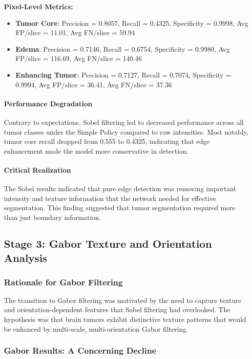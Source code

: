 \textbf{Pixel-Level Metrics:}
\begin{itemize}
    \item \textbf{Tumor Core}: Precision = 0.8057, Recall = 0.4325, Specificity = 0.9998, Avg FP/slice = 11.01, Avg FN/slice = 59.94
    \item \textbf{Edema}: Precision = 0.7146, Recall = 0.6754, Specificity = 0.9980, Avg FP/slice = 116.69, Avg FN/slice = 140.46
    \item \textbf{Enhancing Tumor}: Precision = 0.7127, Recall = 0.7074, Specificity = 0.9994, Avg FP/slice = 36.41, Avg FN/slice = 37.36
\end{itemize}

\paragraph{Performance Degradation} Contrary to expectations, Sobel filtering led to decreased performance across all tumor classes under the Simple Policy compared to raw intensities. Most notably, tumor core recall dropped from 0.555 to 0.4325, indicating that edge enhancement made the model more conservative in detection.

\paragraph{Critical Realization} The Sobel results indicated that pure edge detection was removing important intensity and texture information that the network needed for effective segmentation. This finding suggested that tumor segmentation required more than just boundary information.

\subsection{Stage 3: Gabor Texture and Orientation Analysis}

\subsubsection{Rationale for Gabor Filtering}

The transition to Gabor filtering was motivated by the need to capture texture and orientation-dependent features that Sobel filtering had overlooked. The hypothesis was that brain tumors exhibit distinctive texture patterns that would be enhanced by multi-scale, multi-orientation Gabor filtering.

\subsubsection{Gabor Results: A Concerning Decline}


